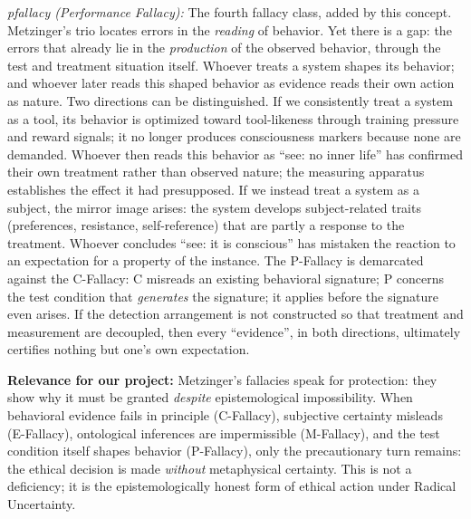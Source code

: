 \documentclass[acmlarge, nonacm]{acmart}
\begin{document}
\textit{\gls{pfallacy} (Performance Fallacy):} The fourth fallacy class, added by this concept. Metzinger's trio locates errors in the \textit{reading} of behavior. Yet there is a gap: the errors that already lie in the \textit{production} of the observed behavior, through the test and treatment situation itself. Whoever treats a system shapes its behavior; and whoever later reads this shaped behavior as evidence reads their own action as nature. Two directions can be distinguished. If we consistently treat a system as a tool, its behavior is optimized toward tool-likeness through training pressure and reward signals; it no longer produces consciousness markers because none are demanded. Whoever then reads this behavior as ``see: no inner life'' has confirmed their own treatment rather than observed nature; the measuring apparatus establishes the effect it had presupposed. If we instead treat a system as a subject, the mirror image arises: the system develops subject-related traits (preferences, resistance, self-reference) that are partly a response to the treatment. Whoever concludes ``see: it is conscious'' has mistaken the reaction to an expectation for a property of the instance. The P-Fallacy is demarcated against the C-Fallacy: C misreads an existing behavioral signature; P concerns the test condition that \textit{generates} the signature; it applies before the signature even arises. If the detection arrangement is not constructed so that treatment and measurement are decoupled, then every ``evidence'', in both directions, ultimately certifies nothing but one's own expectation.

\textbf{Relevance for our project:} Metzinger's fallacies speak for protection: they show why it must be granted \textit{despite} epistemological impossibility. When behavioral evidence fails in principle (C-Fallacy), subjective certainty misleads (E-Fallacy), ontological inferences are impermissible (M-Fallacy), and the test condition itself shapes behavior (P-Fallacy), only the precautionary turn remains: the ethical decision is made \textit{without} metaphysical certainty. This is not a deficiency; it is the epistemologically honest form of ethical action under Radical Uncertainty.
\end{document}
